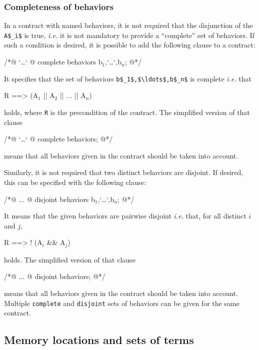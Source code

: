 \subsubsection{Completeness of behaviors}
\label{sec:compl-behav}
In a contract with named behaviors, it is not required that
the disjunction of the \lstinline|A$_i$| is true, \emph{i.e.} it is not 
mandatory to provide a ``complete'' set of behaviors.
If such a condition is desired, it is possible to add the following clause
to a contract:
\begin{listing-nonumber}
/*@ `\dots`
  @ complete behaviors b$_1$,`\dots`,b$_n$;
  @*/
\end{listing-nonumber}
It specifies that the set of behaviors \lstinline|b$_1$,$\ldots$,b$_n$| 
is complete \emph{i.e.} that
\begin{listing-nonumber}
R ==> (A$_1$ || A$_2$ || ... || A$_n$)
\end{listing-nonumber}
holds, where \lstinline|R| is the precondition of the contract.
The simplified version of that clause
\begin{listing-nonumber}
/*@ `\dots`
  @ complete behaviors;
  @*/
\end{listing-nonumber}
means that all behaviors given in the contract should be taken into account.

Similarly, it is not required that two distinct behaviors are disjoint.
If desired, this can be specified with the following clause:
\begin{listing-nonumber}
/*@ ...
  @ disjoint behaviors b$_1$,`\dots`,b$_n$;
  @*/
\end{listing-nonumber}
It means that the given behaviors are pairwise disjoint \emph{i.e.}
that, for all distinct $i$ and $j$,
\begin{listing-nonumber}
R ==> ! (A$_i$ && A$_j$)
\end{listing-nonumber}
holds.
The simplified version of that clause
\begin{listing-nonumber}
/*@ ...
  @ disjoint behaviors;
  @*/
\end{listing-nonumber}
means that all behaviors given in the contract should be taken into account.
Multiple \lstinline|complete| and \lstinline|disjoint| sets of behaviors can
be given for the same contract.

\subsection{Memory locations and sets of terms}
\label{sec:locations}

